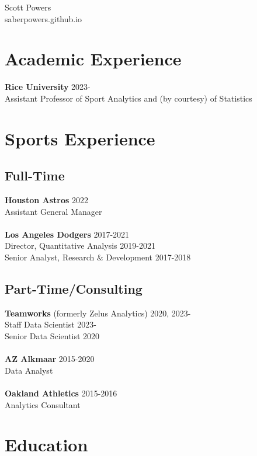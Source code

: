 \documentclass{article}
\begin{document}
\begin{center}
{\huge \sc Scott Powers}\\
saberpowers.github.io
\end{center}


\section*{\sc Academic Experience}

{\bf Rice University} \hfill 2023-\\
Assistant Professor of Sport Analytics and (by courtesy) of Statistics

\section*{\sc Sports Experience}

\subsection*{\sc Full-Time}

{\bf Houston Astros} \hfill 2022\\
Assistant General Manager\\
~\\
{\bf Los Angeles Dodgers} \hfill 2017-2021\\
Director, Quantitative Analysis \hfill {\color{gray} 2019-2021}\\
Senior Analyst, Research \& Development \hfill {\color{gray} 2017-2018}

\subsection*{\sc Part-Time/Consulting}

{\bf Teamworks} (formerly Zelus Analytics) \hfill 2020, 2023-\\
Staff Data Scientist \hfill {\color{gray}2023-}\\
Senior Data Scientist \hfill {\color{gray}2020}\\
~\\
{\bf AZ Alkmaar} \hfill 2015-2020\\
Data Analyst\\
~\\
{\bf Oakland Athletics} \hfill 2015-2016\\
Analytics Consultant

\section*{\sc Education}
\end{document}
